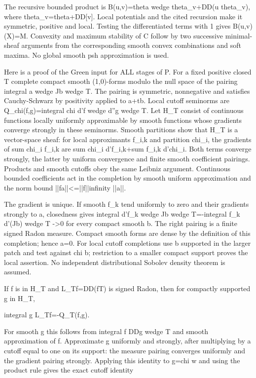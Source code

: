 \documentclass[11pt]{article}
\begin{document}
The recursive bounded product is B(u,v)=theta wedge theta\_v+DD(u theta\_v), where theta\_v=theta+DD[v]. Local potentials and the cited recursion make it symmetric, positive and local. Testing the differentiated terms with 1 gives B(u,v)(X)=M. Convexity and maximum stability of C follow by two successive minimal-sheaf arguments from the corresponding smooth convex combinations and soft maxima. No global smooth psh approximation is used.

Here is a proof of the Green input for ALL stages of P. For a fixed positive closed T complete compact smooth (1,0)-forms modulo the null space of the pairing integral a wedge Jb wedge T. The pairing is symmetric, nonnegative and satisfies Cauchy-Schwarz by positivity applied to a+tb. Local cutoff seminorms are Q\_chi(f,g)=integral chi d'f wedge d''g wedge T. Let H\_T consist of continuous functions locally uniformly approximable by smooth functions whose gradients converge strongly in these seminorms. Smooth partitions show that H\_T is a vector-space sheaf: for local approximants f\_i,k and partition chi\_i, the gradients of sum chi\_i f\_i,k are sum chi\_i d'f\_i,k+sum f\_i,k d'chi\_i. Both terms converge strongly, the latter by uniform convergence and finite smooth coefficient pairings. Products and smooth cutoffs obey the same Leibniz argument. Continuous bounded coefficients act in the completion by smooth uniform approximation and the norm bound ||fa||<=||f||infinity ||a||.

The gradient is unique. If smooth f\_k tend uniformly to zero and their gradients strongly to a, closedness gives integral d'f\_k wedge Jb wedge T=-integral f\_k d'(Jb) wedge T ->0 for every compact smooth b. The right pairing is a finite signed Radon measure. Compact smooth forms are dense by the definition of this completion; hence a=0. For local cutoff completions use b supported in the larger patch and test against chi b; restriction to a smaller compact support proves the local assertion. No independent distributional Sobolev density theorem is assumed.

If f is in H\_T and L\_Tf=DD(fT) is signed Radon, then for compactly supported g in H\_T,

integral g L\_Tf=-Q\_T(f,g).

For smooth g this follows from integral f DDg wedge T and smooth approximation of f. Approximate g uniformly and strongly, after multiplying by a cutoff equal to one on its support: the measure pairing converges uniformly and the gradient pairing strongly. Applying this identity to g=chi w and using the product rule gives the exact cutoff identity
\end{document}
